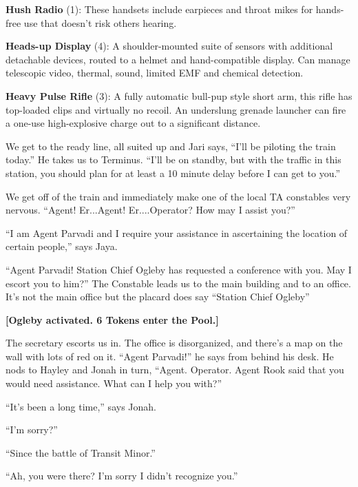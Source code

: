 \textbf{Hush Radio} (1): These handsets include earpieces and throat mikes for hands-free use that doesn't risk others hearing.

\textbf{Heads-up Display} (4): A shoulder-mounted suite of sensors with additional detachable devices, routed to a helmet and hand-compatible display. Can manage telescopic video, thermal, sound, limited EMF and chemical detection.

\textbf{Heavy Pulse Rifle }(3): A fully automatic bull-pup style short arm, this rifle has top-loaded clips and virtually no recoil. An underslung grenade launcher can fire a one-use high-explosive charge out to a significant distance.





We get to the ready line, all suited up and Jari says, ``I'll be piloting the train today.''  He takes us to Terminus.  ``I'll be on standby, but with the traffic in this station, you should plan for at least a 10 minute delay before I can get to you.''



We get off of the train and immediately make one of the local TA constables very nervous.  ``Agent!  Er...Agent!  Er....Operator?  How may I assist you?''

``I am Agent Parvadi and I require your assistance in ascertaining the location of certain people,'' says Jaya.

``Agent Parvadi!  Station Chief Ogleby has requested a conference with you.  May I escort you to him?''  The Constable leads us to the main building and to an office. It's not the main office but the placard does say ``Station Chief Ogleby''



\textbf{{[}Ogleby activated.  6 Tokens enter the Pool.{]}}



The secretary escorts us in.  The office is disorganized, and there's a map on the wall with lots of red on it.  ``Agent Parvadi!'' he says from behind his desk.  He nods to Hayley and Jonah in turn, ``Agent.  Operator.  Agent Rook said that you would need assistance.  What can I help you with?''

``It's been a long time,'' says Jonah.

``I'm sorry?''

``Since the battle of Transit Minor.'' 

``Ah, you were there?  I'm sorry I didn't recognize you.''

